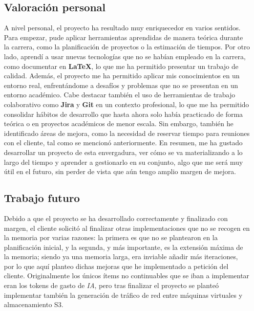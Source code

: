        \subsection{Valoración personal}
         A nivel personal, el proyecto ha resultado muy enriquecedor en varios sentidos. Para empezar, pude aplicar herramientas aprendidas de manera teórica durante la carrera, como la planificación de proyectos o la estimación de tiempos. Por otro lado, aprendí a usar nuevas tecnologías que no se habían empleado en la carrera, como documentar en \textbf{LaTeX}, lo que me ha permitido presentar un trabajo de calidad. Además, el proyecto me ha permitido aplicar mis conocimientos en un entorno real, enfrentándome a desafíos y problemas que no se presentan en un entorno académico. Cabe destacar también el uso de herramientas de trabajo colaborativo como \textbf{Jira} y \textbf{Git} en un contexto profesional, lo que me ha permitido consolidar hábitos de desarrollo que hasta ahora solo había practicado de forma teórica o en proyectos académicos de menor escala. Sin embargo, también he identificado áreas de mejora, como la necesidad de reservar tiempo para reuniones con el cliente, tal como se mencionó anteriormente. En resumen, me ha gustado desarrollar un proyecto de esta envergadura, ver cómo se va materializando a lo largo del tiempo y aprender a gestionarlo en su conjunto, algo que me será muy útil en el futuro, sin perder de vista que aún tengo amplio margen de mejora.

        \subsection{Trabajo futuro}

        
        Debido a que el proyecto se ha desarrollado correctamente y finalizado con margen, el cliente solicitó al finalizar otras implementaciones que no se recogen en la memoria por varias razones: la primera es que no se plantearon en la planificación inicial, y la segunda, y más importante, es la extensión máxima de la memoria; siendo ya una memoria larga, era inviable añadir más iteraciones, por lo que aquí planteo dichas mejoras que he implementado a petición del cliente. Originalmente los únicos ítems no continuables que se iban a implementar eran los tokens de gasto de \textit{IA}, pero tras finalizar el proyecto se planteó implementar también la generación de tráfico de red entre máquinas virtuales y almacenamiento S3.

